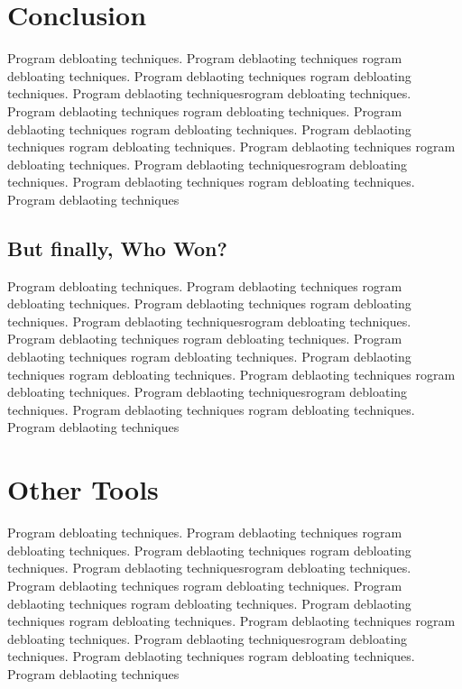 \documentclass{relatorio}
\begin{document}
\section{Conclusion}%
\label{Tools}

Program debloating techniques. Program deblaoting techniques rogram debloating techniques. Program deblaoting techniques
rogram debloating techniques. Program deblaoting techniquesrogram debloating techniques. Program deblaoting techniques
rogram debloating techniques. Program deblaoting techniques rogram debloating techniques. Program deblaoting techniques
rogram debloating techniques. Program deblaoting techniques 
rogram debloating techniques. Program deblaoting techniquesrogram debloating techniques. Program deblaoting techniques
rogram debloating techniques. Program deblaoting techniques

\subsection{But finally, Who Won?}%
\label{Tools}

Program debloating techniques. Program deblaoting techniques rogram debloating techniques. Program deblaoting techniques
rogram debloating techniques. Program deblaoting techniquesrogram debloating techniques. Program deblaoting techniques
rogram debloating techniques. Program deblaoting techniques rogram debloating techniques. Program deblaoting techniques
rogram debloating techniques. Program deblaoting techniques 
rogram debloating techniques. Program deblaoting techniquesrogram debloating techniques. Program deblaoting techniques
rogram debloating techniques. Program deblaoting techniques

\section{Other Tools}%
\label{Tools}

Program debloating techniques. Program deblaoting techniques rogram debloating techniques. Program deblaoting techniques
rogram debloating techniques. Program deblaoting techniquesrogram debloating techniques. Program deblaoting techniques
rogram debloating techniques. Program deblaoting techniques rogram debloating techniques. Program deblaoting techniques
rogram debloating techniques. Program deblaoting techniques 
rogram debloating techniques. Program deblaoting techniquesrogram debloating techniques. Program deblaoting techniques
rogram debloating techniques. Program deblaoting techniques
\end{document}
